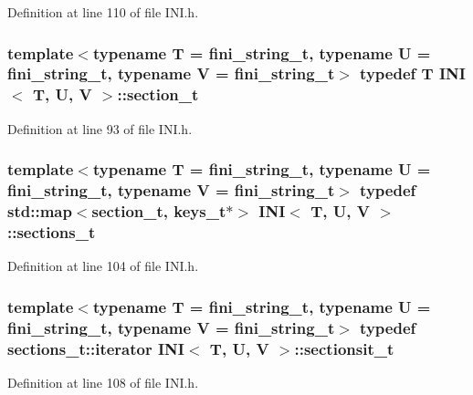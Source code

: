 Definition at line 110 of file I\+N\+I.\+h.

\hypertarget{class_i_n_i_a82551bff97cdd5c7ff183b24bd9b2188}{}
\subsubsection[{section\+\_\+t}]{\setlength{\rightskip}{0pt plus 5cm}template$<$typename T = fini\+\_\+string\+\_\+t, typename U = fini\+\_\+string\+\_\+t, typename V = fini\+\_\+string\+\_\+t$>$ typedef T {\bf I\+N\+I}$<$ T, U, V $>$\+::{\bf section\+\_\+t}}\label{class_i_n_i_a82551bff97cdd5c7ff183b24bd9b2188}


Definition at line 93 of file I\+N\+I.\+h.

\hypertarget{class_i_n_i_ab5fa6745b8a64763b20964a254469aa2}{}
\subsubsection[{sections\+\_\+t}]{\setlength{\rightskip}{0pt plus 5cm}template$<$typename T = fini\+\_\+string\+\_\+t, typename U = fini\+\_\+string\+\_\+t, typename V = fini\+\_\+string\+\_\+t$>$ typedef std\+::map$<${\bf section\+\_\+t}, {\bf keys\+\_\+t}$\ast$$>$ {\bf I\+N\+I}$<$ T, U, V $>$\+::{\bf sections\+\_\+t}}\label{class_i_n_i_ab5fa6745b8a64763b20964a254469aa2}


Definition at line 104 of file I\+N\+I.\+h.

\hypertarget{class_i_n_i_a847131e25df0c4d420599b1990a21132}{}
\subsubsection[{sectionsit\+\_\+t}]{\setlength{\rightskip}{0pt plus 5cm}template$<$typename T = fini\+\_\+string\+\_\+t, typename U = fini\+\_\+string\+\_\+t, typename V = fini\+\_\+string\+\_\+t$>$ typedef sections\+\_\+t\+::iterator {\bf I\+N\+I}$<$ T, U, V $>$\+::{\bf sectionsit\+\_\+t}}\label{class_i_n_i_a847131e25df0c4d420599b1990a21132}


Definition at line 108 of file I\+N\+I.\+h.

\hypertarget{class_i_n_i_a87b850df48a4bf8c792df26927dec359}{}
